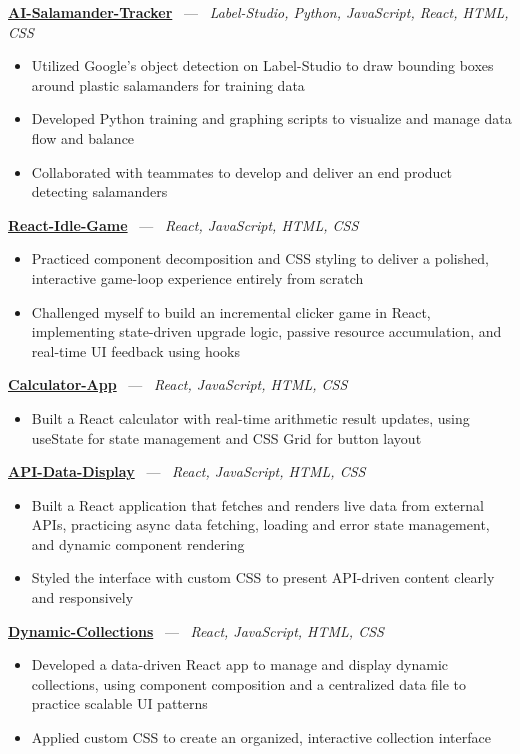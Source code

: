 \documentclass[10pt, letterpaper]{article}
\newcommand{\projhead}[3]{%
  \vspace{5pt}%
  {\bfseries\color{dark}\href{#2}{#1}}%
  ~{\color{light}---}~%
  {\color{light}\small\textit{#3}}\\[-2pt]%
}
\begin{document}
\projhead{AI-Salamander-Tracker}{https://github.com/xavierb117/Salamander-Tracker-YOLO}{Label-Studio, Python, JavaScript, React, HTML, CSS}
\begin{itemize}
  \item Utilized Google's object detection on Label-Studio to draw bounding boxes around plastic salamanders for training data
  \item Developed Python training and graphing scripts to visualize and manage data flow and balance
  \item Collaborated with teammates to develop and deliver an end product detecting salamanders
\end{itemize}

\projhead{React-Idle-Game}{https://github.com/timmyd4/React-Idle-Game}{React, JavaScript, HTML, CSS}
\begin{itemize}
  \item Practiced component decomposition and CSS styling to deliver a polished, interactive game-loop experience entirely from scratch
  \item Challenged myself to build an incremental clicker game in React, implementing state-driven upgrade logic, passive resource accumulation, and real-time UI feedback using hooks
\end{itemize}

\projhead{Calculator-App}{https://github.com/timmyd4/CalculatorApp-React-Fall2025}{React, JavaScript, HTML, CSS}
\begin{itemize}
  \item Built a React calculator with real-time arithmetic result updates, using useState for state management and CSS Grid for button layout
\end{itemize}

\projhead{API-Data-Display}{https://github.com/timmyd4/API-Data-Display}{React, JavaScript, HTML, CSS}
\begin{itemize}
  \item Built a React application that fetches and renders live data from external APIs, practicing async data fetching, loading and error state management, and dynamic component rendering
  \item Styled the interface with custom CSS to present API-driven content clearly and responsively
\end{itemize}

\projhead{Dynamic-Collections}{https://github.com/timmyd4/Dynamic-Collections}{React, JavaScript, HTML, CSS}
\begin{itemize}
  \item Developed a data-driven React app to manage and display dynamic collections, using component composition and a centralized data file to practice scalable UI patterns
  \item Applied custom CSS to create an organized, interactive collection interface
\end{itemize}
\end{document}
